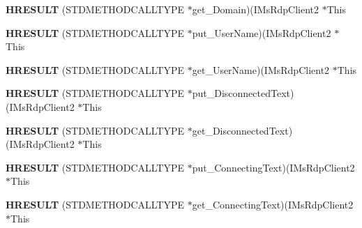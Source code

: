 \begin{DoxyCompactItemize}
\item 
\mbox{\label{struct_i_ms_rdp_client2_vtbl_a046d8317a390a6cc3ce6e4ce2872bdf6}} 
{\bfseries H\+R\+E\+S\+U\+LT} (S\+T\+D\+M\+E\+T\+H\+O\+D\+C\+A\+L\+L\+T\+Y\+PE $\ast$get\+\_\+\+Domain)(I\+Ms\+Rdp\+Client2 $\ast$This
\item 
\mbox{\label{struct_i_ms_rdp_client2_vtbl_afb8d3266f30e94f711863846011cf6c4}} 
{\bfseries H\+R\+E\+S\+U\+LT} (S\+T\+D\+M\+E\+T\+H\+O\+D\+C\+A\+L\+L\+T\+Y\+PE $\ast$put\+\_\+\+User\+Name)(I\+Ms\+Rdp\+Client2 $\ast$This
\item 
\mbox{\label{struct_i_ms_rdp_client2_vtbl_af569132693436a1b870fb52e9bb51b02}} 
{\bfseries H\+R\+E\+S\+U\+LT} (S\+T\+D\+M\+E\+T\+H\+O\+D\+C\+A\+L\+L\+T\+Y\+PE $\ast$get\+\_\+\+User\+Name)(I\+Ms\+Rdp\+Client2 $\ast$This
\item 
\mbox{\label{struct_i_ms_rdp_client2_vtbl_a663920302be9e25a641d5ed0e386273f}} 
{\bfseries H\+R\+E\+S\+U\+LT} (S\+T\+D\+M\+E\+T\+H\+O\+D\+C\+A\+L\+L\+T\+Y\+PE $\ast$put\+\_\+\+Disconnected\+Text)(I\+Ms\+Rdp\+Client2 $\ast$This
\item 
\mbox{\label{struct_i_ms_rdp_client2_vtbl_a79fb17109869a5e67f7c609b178ddc23}} 
{\bfseries H\+R\+E\+S\+U\+LT} (S\+T\+D\+M\+E\+T\+H\+O\+D\+C\+A\+L\+L\+T\+Y\+PE $\ast$get\+\_\+\+Disconnected\+Text)(I\+Ms\+Rdp\+Client2 $\ast$This
\item 
\mbox{\label{struct_i_ms_rdp_client2_vtbl_a954bda2f1459727400f5c1c113737902}} 
{\bfseries H\+R\+E\+S\+U\+LT} (S\+T\+D\+M\+E\+T\+H\+O\+D\+C\+A\+L\+L\+T\+Y\+PE $\ast$put\+\_\+\+Connecting\+Text)(I\+Ms\+Rdp\+Client2 $\ast$This
\item 
\mbox{\label{struct_i_ms_rdp_client2_vtbl_aa20780626e57d5c36beaff5c7ecbc51d}} 
{\bfseries H\+R\+E\+S\+U\+LT} (S\+T\+D\+M\+E\+T\+H\+O\+D\+C\+A\+L\+L\+T\+Y\+PE $\ast$get\+\_\+\+Connecting\+Text)(I\+Ms\+Rdp\+Client2 $\ast$This
\item 
\mbox{\label{struct_i_ms_rdp_client2_vtbl_a190b27d0723b6920b59f20bc66da0dab}} 

\end{DoxyCompactItemize}
